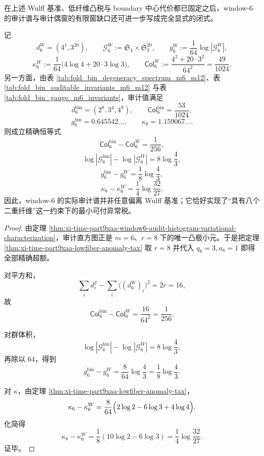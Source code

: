 在上述 Wulff 基准、低纤维凸税与 boundary 中心代价都已固定之后，window-\(6\) 的审计谱与审计偶窗的有限窗缺口还可进一步写成完全显式的闭式。

\begin{theorem}\label{thm:xi-time-part9xaa-window6-audited-spectrum-exact-tax}
记
\[
d_6^{W}=(4^1,3^{20}),
\qquad
\mathcal G_6^{W}:=\mathfrak S_4\times \mathfrak S_3^{20},
\qquad
g_6^{W}:=\frac1{64}\log|\mathcal G_6^{W}|,
\]
\[
\kappa_6^{W}:=\frac1{64}\bigl(4\log4+20\cdot 3\log3\bigr),
\qquad
\mathsf{Col}_6^{W}:=\frac{4^2+20\cdot 3^2}{64^2}=\frac{49}{1024}.
\]
另一方面，由表 \ref{tab:fold_bin_degeneracy_spectrum_m6_m12}、表 \ref{tab:fold_bin_auditable_invariants_m6_m12} 与表 \ref{tab:fold_bin_gauge_m6_invariants}，审计值满足
\[
d_6^{\mathrm{bin}}=(2^8,3^4,4^9),
\qquad
\mathsf{Col}_6^{\mathrm{bin}}=\frac{53}{1024},
\]
\[
g_6^{\mathrm{bin}}=0.645542\ldots,
\qquad
\kappa_6=1.159067\ldots.
\]
则成立精确恒等式
\[
\mathsf{Col}_6^{\mathrm{bin}}-\mathsf{Col}_6^{W}=\frac1{256},
\]
\[
\log|\mathcal G_6^{\mathrm{bin}}|-\log|\mathcal G_6^{W}|=8\log\frac43,
\]
\[
g_6^{\mathrm{bin}}-g_6^{W}=\frac18\log\frac43,
\]
\[
\kappa_6-\kappa_6^{W}=\frac14\log\frac{32}{27}.
\]
因此，window-\(6\) 的实际审计谱并非任意偏离 Wulff 基准；它恰好实现了“具有八个二重纤维”这一约束下的最小可付异常税。
\end{theorem}
\begin{proof}
由定理 \ref{thm:xi-time-part9xaa-window6-audit-histogram-variational-characterization}，审计直方图正是 \(m=6\)、\(r=8\) 下的唯一凸极小元。于是把定理 \ref{thm:xi-time-part9xaa-lowfiber-anomaly-tax} 取 \(r=8\) 并代入 \(q_6=3,a_6=1\) 即得全部精确超额。

对平方和，
\[
\sum_i d_i^2-\sum_i \bigl((d_6^{W})_i\bigr)^2=2r=16,
\]
故
\[
\mathsf{Col}_6^{\mathrm{bin}}-\mathsf{Col}_6^{W}
=
\frac{16}{64^2}
=
\frac1{256}.
\]

对群体积，
\[
\log|\mathcal G_6^{\mathrm{bin}}|-\log|\mathcal G_6^{W}|
=
8\log\frac{4}{3},
\]
再除以 \(64\)，得到
\[
g_6^{\mathrm{bin}}-g_6^{W}
=
\frac{8}{64}\log\frac43
=
\frac18\log\frac43.
\]

对 \(\kappa\)，由定理 \ref{thm:xi-time-part9xaa-lowfiber-anomaly-tax}，
\[
\kappa_6-\kappa_6^{W}
=
\frac{8}{64}\Bigl(2\log2-6\log3+4\log4\Bigr).
\]
化简得
\[
\kappa_6-\kappa_6^{W}
=
\frac18(10\log2-6\log3)
=
\frac14\log\frac{32}{27}.
\]
证毕。
\end{proof}

